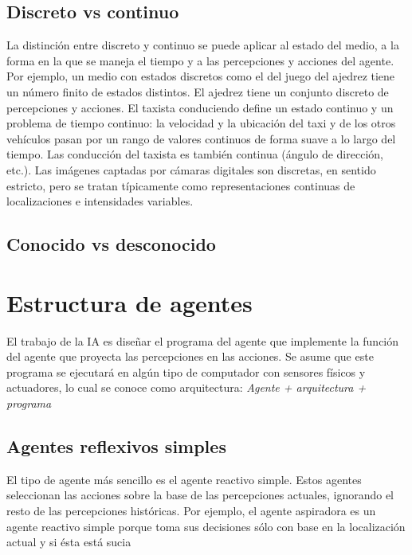 \documentclass[12pt,a4paper]{report}
\begin{document}
\subsection*{Discreto vs continuo}
La distinción entre discreto y continuo se puede aplicar al estado del medio, a la forma en la que se maneja el tiempo y a las percepciones y acciones del agente. Por ejemplo, un medio con estados discretos como el del juego del ajedrez tiene un número finito de estados distintos. El ajedrez tiene un conjunto discreto de percepciones y acciones. El taxista conduciendo define un estado continuo y un problema de tiempo continuo: la velocidad y la ubicación del taxi y de los otros vehículos pasan por un rango de valores continuos de forma suave a lo largo del tiempo. Las conducción del taxista es también continua (ángulo de dirección, etc.). Las imágenes captadas por cámaras digitales son discretas, en sentido estricto, pero se tratan típicamente como representaciones continuas de localizaciones e intensidades variables.
\subsection*{Conocido vs desconocido}

\section{Estructura de agentes}
El trabajo de la IA es diseñar el programa del agente que implemente la función del agente que proyecta las percepciones en las acciones. Se asume que este programa se ejecutará en algún tipo de computador con sensores físicos y actuadores, lo cual se conoce como arquitectura: \emph{Agente + arquitectura + programa}
\subsection*{Agentes reflexivos simples}
El tipo de agente más sencillo es el agente reactivo simple. Estos agentes seleccionan las acciones sobre la base de las percepciones actuales, ignorando el resto de las percepciones históricas. Por ejemplo, el agente aspiradora es un agente reactivo simple porque toma sus decisiones sólo con base en la localización actual y si ésta está sucia
\end{document}

